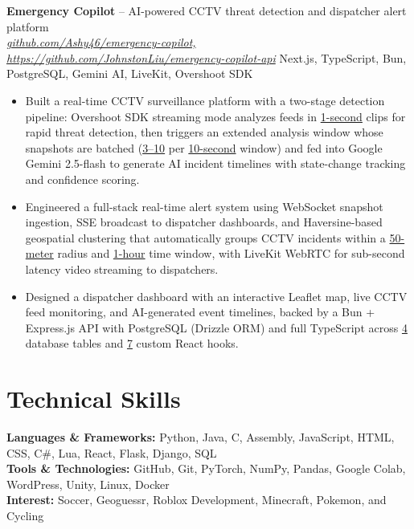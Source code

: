 \documentclass[10pt]{article}
\begin{document}
\textbf{Emergency Copilot} -- AI-powered CCTV threat detection and dispatcher alert platform\\
  \href{https://github.com/Ashy46/emergency-copilot, https://github.com/JohnstonLiu/emergency-copilot-api}{\textit{github.com/Ashy46/emergency-copilot, https://github.com/JohnstonLiu/emergency-copilot-api}} \textbar{} Next.js, TypeScript, Bun, PostgreSQL, Gemini AI, LiveKit, Overshoot SDK
  \vspace*{-0.5em}
  \begin{itemize}
      \item Built a real-time CCTV surveillance platform with a two-stage detection pipeline:
  Overshoot SDK streaming mode analyzes feeds in \underline{1-second} clips for rapid threat
  detection, then triggers an extended analysis window whose snapshots are batched (\underline{3--10}
  per \underline{10-second} window) and fed into Google Gemini 2.5-flash to generate AI incident
  timelines with state-change tracking and confidence scoring.

      \item Engineered a full-stack real-time alert system using WebSocket snapshot ingestion, SSE
  broadcast to dispatcher dashboards, and Haversine-based geospatial clustering that automatically
  groups CCTV incidents within a \underline{50-meter} radius and \underline{1-hour} time window, with
  LiveKit WebRTC for sub-second latency video streaming to dispatchers.

      \item Designed a dispatcher dashboard with an interactive Leaflet map, live CCTV feed
  monitoring, and AI-generated event timelines, backed by a Bun + Express.js API with PostgreSQL
  (Drizzle ORM) and full TypeScript across \underline{4} database tables and \underline{7} custom
  React hooks.
\end{itemize}

\section*{Technical Skills}
\textbf{Languages \& Frameworks:} Python, Java, C, Assembly, JavaScript, HTML, CSS, C\#, Lua, React, Flask, Django, SQL \\
\textbf{Tools \& Technologies:} GitHub, Git, PyTorch, NumPy, Pandas, Google Colab, WordPress, Unity, Linux, Docker \\
\textbf{Interest:} Soccer, Geoguessr, Roblox Development, Minecraft, Pokemon, and Cycling \\
\end{document}
